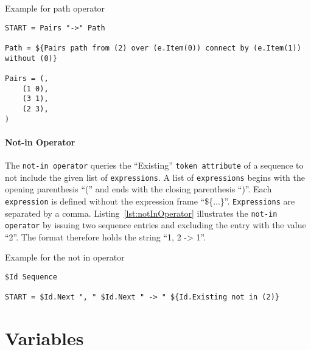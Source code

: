 \begin{listing}
\caption{Example for path operator}
\label{lst:pathOperator}
\begin{verbatim}
START = Pairs "->" Path

Path = ${Pairs path from (2) over (e.Item(0)) connect by (e.Item(1)) without (0)}

Pairs = (,
	(1 0),
	(3 1),
	(2 3),
)
\end{verbatim}
\end{listing}

\paragraph{Not-in Operator}
\label{subsec:notInOperators}

The \texttt{not-in operator} queries the \enquote{Existing} \texttt{token attribute} of a sequence to not include the given list of \texttt{expressions}. A list of \texttt{expressions} begins with the opening parenthesis \enquote{(} and ends with the closing parenthesis \enquote{)}. Each \texttt{expression} is defined without the expression frame \enquote{\$\{...\}}. \texttt{Expressions} are separated by a comma. Listing~\ref{lst:notInOperator} illustrates the \texttt{not-in operator} by issuing two sequence entries and excluding the entry with the value \enquote{2}. The format therefore holds the string \enquote{1, 2 -> 1}.

\begin{listing}
\caption{Example for the not in operator}
\label{lst:notInOperator}
\begin{verbatim}
$Id Sequence

START = $Id.Next ", " $Id.Next " -> " ${Id.Existing not in (2)}
\end{verbatim}
\end{listing}

\section{Variables}
\label{sec:variables}

